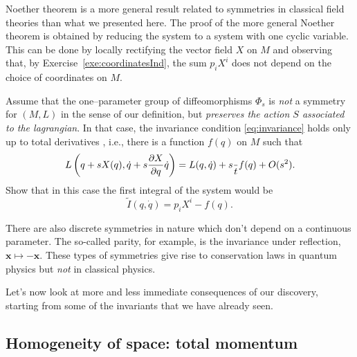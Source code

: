 \documentclass[english,fontsize=11pt,paper=a5,oneside]{scrbook}
\newcommand{\bx}{\bm{x}}
\let\d\relax
\newcommand{\d}{\mathrm{d}}
\theoremstyle{definition}
\newenvironment{remark}
  {\pushQED{\qed}\renewcommand{\qedsymbol}{$\lozenge$}\remarkx}
  {\popQED\endremarkx}
\newenvironment{exercise}
  {\pushQED{\qed}\renewcommand{\qedsymbol}{$\maltese$}\exercisex}
  {\popQED\endexercisex}
\begin{document}
\begin{remark}
  Noether theorem is a more general result related to symmetries in classical field theories than what we presented here.
  The proof of the more general Noether theorem is obtained by reducing the system to a system with one cyclic variable.
  This can be done by locally rectifying the vector field $X$ on $M$ and observing that, by Exercise~\ref{exe:coordinatesInd}, the sum $p_i X^i$ does not depend on the choice of coordinates on $M$.
\end{remark}

\begin{exercise}
  Assume that the one--parameter group of diffeomorphisms $\Phi_s$ is \emph{not} a symmetry for $(M,L)$ in the sense of our definition, but \emph{preserves the action $S$ associated to the lagrangian}.
  In that case, the invariance condition \eqref{eq:invariance} holds only up to total derivatives \cite[Chapter 4.20]{book:gelfand}, i.e., there is a function $f(q)$ on $M$ such that
  \begin{equation}
    L\left( q + s X(q), \dot q + s \frac{\partial X}{\partial q} \dot q\right)
    = L(q, \dot q) + s \frac{\d}{\d t}f(q) + O(s^2).
  \end{equation}
  Show that in this case the first integral of the system would be
  \begin{equation}
    \widetilde I(q, \dot q) = p_i X^i - f(q).
  \end{equation}
\end{exercise}

\begin{remark}
  There are also discrete symmetries in nature which don't depend on a continuous parameter. The so-called parity, for example, is the invariance under reflection, $\bx \mapsto -\bx$.
  These types of symmetries give rise to conservation laws in quantum physics but \emph{not} in classical physics.
\end{remark}

Let's now look at more and less immediate consequences of our discovery, starting from some of the invariants that we have already seen.

\subsection{Homogeneity of space: total momentum}
\end{document}
